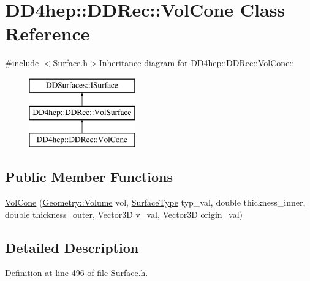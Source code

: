 \hypertarget{class_d_d4hep_1_1_d_d_rec_1_1_vol_cone}{
\section{DD4hep::DDRec::VolCone Class Reference}
\label{class_d_d4hep_1_1_d_d_rec_1_1_vol_cone}
}


{\ttfamily \#include $<$Surface.h$>$}Inheritance diagram for DD4hep::DDRec::VolCone::\begin{figure}[H]
\begin{center}
\leavevmode
\includegraphics[height=3cm]{class_d_d4hep_1_1_d_d_rec_1_1_vol_cone}
\end{center}
\end{figure}
\subsection*{Public Member Functions}
\begin{DoxyCompactItemize}
\item 
\hyperlink{class_d_d4hep_1_1_d_d_rec_1_1_vol_cone_a99d5b9981b298e9bbde8929511e157d1}{VolCone} (\hyperlink{class_d_d4hep_1_1_geometry_1_1_volume}{Geometry::Volume} vol, \hyperlink{class_d_d_surfaces_1_1_surface_type}{SurfaceType} typ\_\-val, double thickness\_\-inner, double thickness\_\-outer, \hyperlink{class_d_d_surfaces_1_1_vector3_d}{Vector3D} v\_\-val, \hyperlink{class_d_d_surfaces_1_1_vector3_d}{Vector3D} origin\_\-val)
\end{DoxyCompactItemize}


\subsection{Detailed Description}


Definition at line 496 of file Surface.h.

